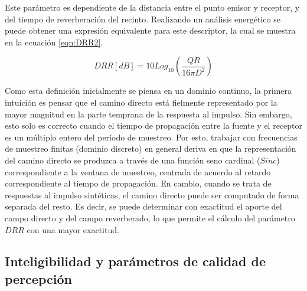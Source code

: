 Este parámetro es dependiente de la distancia entre el punto emisor y receptor, y del tiempo de reverberación del recinto. Realizando un análisis energético \cite{libro_dereverb} se puede obtener una expresión equivalente para este descriptor, la cual se muestra en la ecuación \ref{eqn:DRR2}.

\begin{equation}
\label{eqn:DRR2}
	DRR [dB]= 10 Log_{10}(\frac{QR}{16 \pi D^{2}}) 
\end{equation}



Como esta definición inicialmente se piensa en un dominio continuo, la primera intuición es pensar que el camino directo está fielmente representado por la mayor magnitud en la parte temprana de la respuesta al impulso. Sin embargo, esto solo es correcto cuando el tiempo de propagación entre la fuente y el receptor es un múltiplo entero del período de muestreo. Por esto, trabajar con frecuencias de muestreo finitas (dominio discreto) en general deriva en que la representación del camino directo se produzca a través de una función seno cardinal ($Sinc$) correspondiente a la ventana de muestreo, centrada de acuerdo al retardo correspondiente al tiempo de propagación. En cambio, cuando se trata de respuestas al impulso sintéticas, el camino directo puede ser computado de forma separada del resto. Es decir, se puede determinar con exactitud el aporte del campo directo y del campo reverberado, lo que permite el cálculo del parámetro $DRR$ con una mayor exactitud. 




\subsection{Inteligibilidad y parámetros de calidad de percepción}


